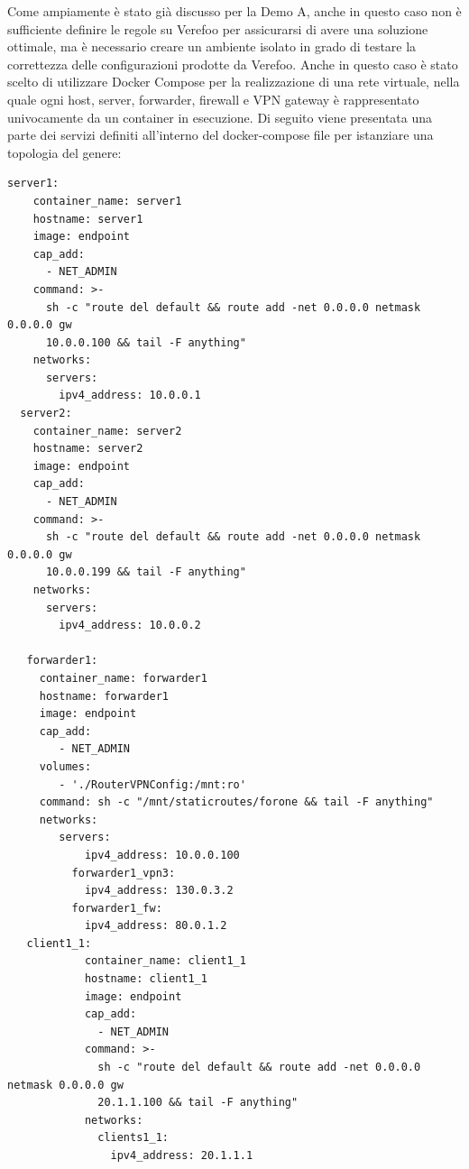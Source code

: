 Come ampiamente è stato già discusso per la Demo A, anche in questo caso non è sufficiente definire le regole su Verefoo per assicurarsi di avere una soluzione ottimale, ma è necessario creare un ambiente isolato in grado di testare la correttezza delle configurazioni prodotte da Verefoo. Anche in questo caso è stato scelto
di utilizzare Docker Compose per la realizzazione di una rete virtuale, nella quale ogni host, server, forwarder, firewall e VPN gateway è rappresentato univocamente da un container in esecuzione. Di seguito viene presentata una parte dei servizi definiti all'interno del docker-compose file per istanziare una topologia del genere:

\begin{lstlisting}[style=yaml,caption={Definizione di Services dell'ambiente virtuale DemoB},label=composeDemoA]
    server1:
    container_name: server1
    hostname: server1
    image: endpoint
    cap_add:
      - NET_ADMIN
    command: >-
      sh -c "route del default && route add -net 0.0.0.0 netmask 0.0.0.0 gw
      10.0.0.100 && tail -F anything"
    networks:
      servers:
        ipv4_address: 10.0.0.1
  server2:
    container_name: server2
    hostname: server2
    image: endpoint
    cap_add:
      - NET_ADMIN
    command: >-
      sh -c "route del default && route add -net 0.0.0.0 netmask 0.0.0.0 gw
      10.0.0.199 && tail -F anything"
    networks:
      servers:
        ipv4_address: 10.0.0.2

   forwarder1:
     container_name: forwarder1
     hostname: forwarder1
     image: endpoint
     cap_add:
        - NET_ADMIN
     volumes:
        - './RouterVPNConfig:/mnt:ro'
     command: sh -c "/mnt/staticroutes/forone && tail -F anything"
     networks:
        servers:
            ipv4_address: 10.0.0.100
          forwarder1_vpn3:
            ipv4_address: 130.0.3.2
          forwarder1_fw: 
            ipv4_address: 80.0.1.2
   client1_1:
            container_name: client1_1
            hostname: client1_1
            image: endpoint
            cap_add:
              - NET_ADMIN
            command: >-
              sh -c "route del default && route add -net 0.0.0.0 netmask 0.0.0.0 gw
              20.1.1.100 && tail -F anything"
            networks:
              clients1_1:
                ipv4_address: 20.1.1.1
    
\end{lstlisting}


